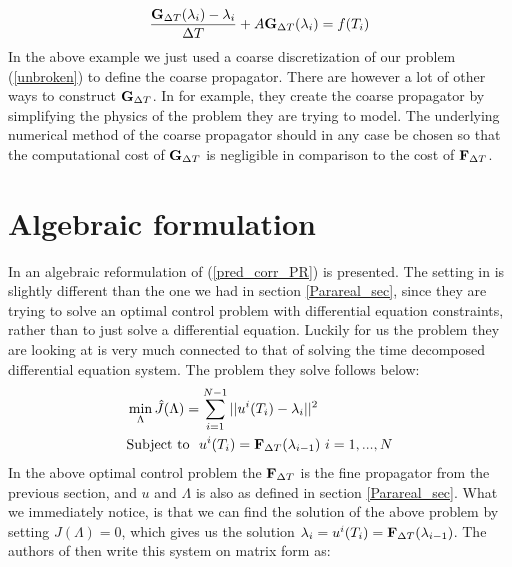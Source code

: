 \begin{align}
\frac{\bold{G}_{\Delta T}(\lambda_i) -\lambda_i }{\Delta T } + A \bold{G}_{\Delta T}(\lambda_i) = f(T_{i}) \label{G_Backward}
\end{align}
In the above example we just used a coarse discretization of our problem (\ref{unbroken}) to define the coarse propagator. There are however a lot of other ways to construct $\bold{G}_{\Delta T}$. In \cite{baffico2002parallel} for example, they create the coarse propagator by simplifying the physics of the problem they are trying to model. The underlying numerical method of the coarse propagator should in any case be chosen so that the computational cost of $\bold{G}_{\Delta T}$ is negligible in comparison to the cost of  $\bold{F}_{\Delta T}$.
\section{Algebraic formulation}\label{algebraic_sec}
In \cite{maday2002parareal} an algebraic reformulation of (\ref{pred_corr_PR}) is presented. The setting in \cite{maday2002parareal} is slightly different than the one we had in section \ref{Parareal_sec}, since they are trying to solve an optimal control problem with differential equation constraints, rather than to just solve a differential equation. Luckily for us the problem they are looking at is very much connected to that of solving the time decomposed differential equation system. The problem they solve follows below:
\begin{align*}
&\min_{\Lambda}\hat{J}(\Lambda) = \sum_{i=1}^{N-1} ||u^{i}(T_{i})-\lambda_{i}||^2 \\
&\textrm{Subject to } \ u^{i}(T_{i}) = \bold F_{\Delta T}(\lambda_{i-1}) \ i=1,...,N
\end{align*}
In the above optimal control problem the $\bold F_{\Delta T}$ is the fine propagator from the previous section, and $u$ and $\Lambda$ is also as defined in section \ref{Parareal_sec}. What we immediately notice, is that we can find the solution of the above problem by setting $J(\Lambda)=0$, which gives us the solution $\lambda_{i}= u^{i}(T_{i})=\bold F_{\Delta T}(\lambda_{i-1})$. The authors of \cite{maday2002parareal} then write this system on matrix form as:
